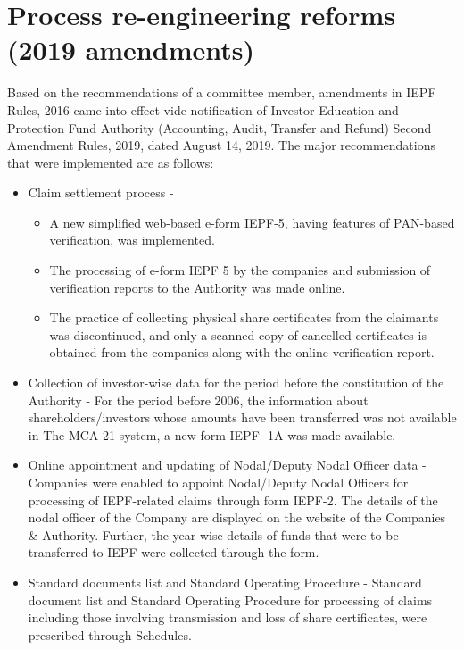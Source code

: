 \documentclass[openany]{book}
\begin{document}
\section{Process re-engineering reforms (2019 amendments)} \cite{iepfa_annual_reports}
Based on the recommendations of a committee member, amendments in IEPF Rules, 2016 came into effect vide notification of Investor Education and Protection Fund
Authority (Accounting, Audit, Transfer and Refund) Second Amendment Rules, 2019, dated August 14, 2019. The major recommendations that were implemented are as
follows:
\begin{itemize}
    \item Claim settlement process -
    \begin{itemize}
        \item A new simplified web-based e-form IEPF-5, having features of PAN-based verification, was implemented. 
        \item The processing of e-form IEPF 5 by the companies and submission of verification reports to the Authority was made online. 
        \item The practice of collecting physical share certificates from the claimants was discontinued, and only a scanned copy of cancelled certificates is obtained from the companies along with the online verification report. 
    \end{itemize}  
    \item Collection of investor-wise data for the period before the constitution of the Authority - For the period before 2006, the information about shareholders/investors whose amounts have been transferred was not available in The MCA 21 system, a new form IEPF -1A was made available. \\
    \item Online appointment and updating of Nodal/Deputy Nodal Officer data - Companies were enabled to appoint Nodal/Deputy Nodal Officers for processing of IEPF-related claims through form IEPF-2. The details of the nodal officer of the Company are displayed on the website of the Companies & Authority. Further, the year-wise details of funds that were to be transferred to IEPF were collected through the form. \\
    \item  Standard documents list and Standard Operating Procedure - Standard document list and Standard Operating Procedure for processing of claims including those involving transmission and loss of share certificates, were prescribed through Schedules. 
    
\end{itemize}
\end{document}

